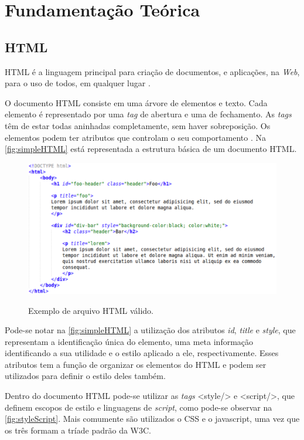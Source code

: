 %
%

\chapter{Fundamentação Teórica}
\label{chap:fund-teor}
\section{HTML}
\label{sec:html}
HTML é a linguagem principal para criação de documentos, e aplicações, na \textit{Web}, para o uso de todos, em qualquer lugar \cite{W3Chtml2015}.

O documento HTML consiste em uma árvore de elementos e texto. Cada elemento é representado por uma \textit{tag} de abertura e uma de fechamento. As \textit{tags} têm de estar todas aninhadas completamente, sem haver sobreposição. Os elementos podem ter atributos que controlam o seu comportamento \cite{HTMLspec2014}. Na \autoref{fig:simpleHTML} está representada a estrutura básica de um documento HTML.

\begin{figure}[!htb]
	\centering
	\caption{Exemplo de arquivo HTML válido.}
	\includegraphics[width=1\textwidth]{./04-figuras/html_simples}
	\label{fig:simpleHTML}
\end{figure}

Pode-se notar na \autoref{fig:simpleHTML} a utilização dos atributos \textit{id}, \textit{title} e \textit{style}, que representam a identificação única do elemento, uma meta informação identificando a sua utilidade e o estilo aplicado a ele, respectivamente. Esses atributos tem a função de organizar os elementos do HTML e podem ser utilizados para definir o estilo deles também.

Dentro do documento HTML pode-se utilizar as \textit{tags} <style/> e <script/>, que definem escopos de estilo e linguagens de \textit{script}, como pode-se observar na \autoref{fig:styleScript}. Mais comumente são utilizados o CSS e o javascript, uma vez que os três formam a tríade padrão da W3C.

